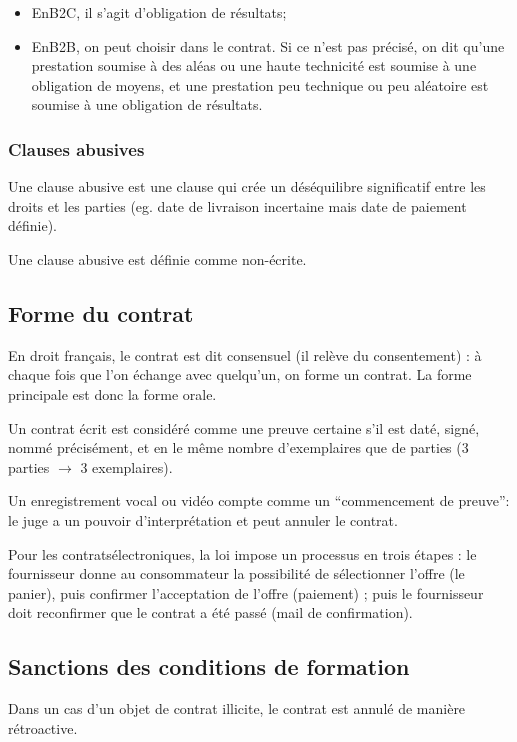 \documentclass[10pt,a4paper,french]{article}
\begin{document}
\begin{itemize}
\item EnB2C, il s'agit d'obligation de résultats;
\item EnB2B, on peut choisir dans le contrat. Si ce n'est pas précisé, on dit qu'une prestation soumise à des aléas ou une haute technicité est soumise à une obligation de moyens, et une prestation peu technique ou peu aléatoire est soumise à une obligation de résultats.
\end{itemize}

\subsubsection{Clauses abusives}
Une clause abusive est une clause qui crée un déséquilibre significatif entre les droits et les parties (eg. date de livraison incertaine mais date de paiement définie).

Une clause abusive est définie comme non-écrite.

\subsection{Forme du contrat}
En droit français, le contrat est dit consensuel (il relève du consentement) : à chaque fois que l'on échange avec quelqu'un, on forme un contrat. La forme principale est donc la forme orale.

Un contrat écrit est considéré comme une preuve certaine s'il est daté, signé, nommé précisément, et en le même nombre d'exemplaires que de parties (3 parties $\to$ 3 exemplaires).

Un enregistrement vocal ou vidéo compte comme un ``commencement de preuve'': le juge a un pouvoir d'interprétation et peut annuler le contrat.

Pour les contratsélectroniques, la loi impose un processus en trois étapes : le fournisseur donne au consommateur la possibilité de sélectionner l'offre (le panier), puis confirmer l'acceptation de l'offre (paiement) ; puis le fournisseur doit reconfirmer que le contrat a été passé (mail de confirmation).

\subsection{Sanctions des conditions de formation}
Dans un cas d'un objet de contrat illicite, le contrat est annulé de manière rétroactive.
\end{document}
